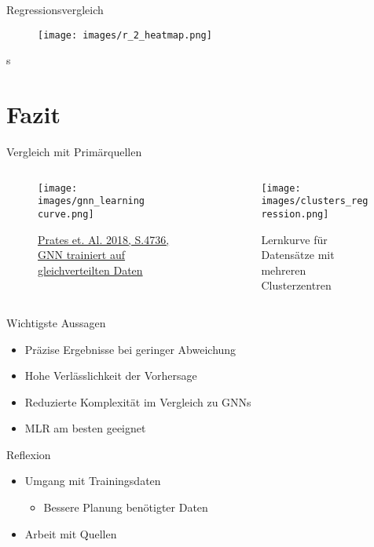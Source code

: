 \begin{frame}{Regressionsvergleich}
    \begin{figure}
        \centering
        \texttt{[image: images/r\_2\_heatmap.png]}
        \label{fig:enter-label}
    \end{figure}
\end{frame}s
\section{Fazit}
\begin{frame}{Vergleich mit Primärquellen}
    \begin{columns}
        \begin{column}{0.5\textwidth}
            \begin{figure}
            \centering
                \texttt{[image: images/gnn\_learning curve.png]}
                \caption{\href{https://arxiv.org/pdf/1809.02721.pdf}{Prates et. Al. 2018, S.4736, GNN trainiert auf gleichverteilten Daten}}
            \end{figure}
        \end{column}
        \begin{column}{0.5\textwidth}
            \begin{figure}
            \centering
                \texttt{[image: images/clusters\_regression.png]}
                \caption{Lernkurve für Datensätze mit mehreren Clusterzentren}
            \end{figure}
        \end{column}
    \end{columns}
\end{frame}

\begin{frame}{Wichtigste Aussagen}
    \begin{itemize}
        \item Präzise Ergebnisse bei geringer Abweichung
        \item Hohe Verlässlichkeit der Vorhersage
        \item Reduzierte Komplexität im Vergleich zu GNNs
        \item MLR am besten geeignet
    \end{itemize}
\end{frame}

\begin{frame}{Reflexion}
    \begin{itemize}
        \item Umgang mit Trainingsdaten
            \begin{itemize}
                \item Bessere Planung benötigter Daten
            \end{itemize}
        \item Arbeit mit Quellen
    \end{itemize}
\end{frame}

